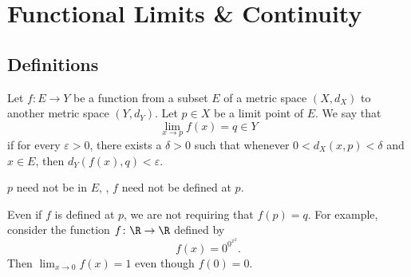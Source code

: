 \chapter{Functional Limits \& Continuity} \label{chp:fn}
\section{Definitions} \label{sec:fn:def}
\begin{definition}[Limit] \label{def:fn:limit}
    Let $f\colon E \to Y$ be a function from a subset $E$ of a metric space
    $(X, d_X)$ to another metric space $(Y, d_Y)$.
    Let $p \in X$ be a limit point of $E$.
    We say that \[
        \lim_{x \to p} f(x) = q \in Y
    \] if for every $\varepsilon > 0$, there exists a $\delta > 0$ such that
    whenever $0 < d_X(x, p) < \delta$ and $x \in E$,
    then $d_Y(f(x), q) < \varepsilon$.
\end{definition}
\begin{remarks}
    \item $p$ need not be in $E$, \ie, $f$ need not be defined at $p$.
    \item Even if $f$ is defined at $p$, we are not requiring that
    $f(p) = q$.
    For example, consider the function $f\colon \R \to \R$ defined by \[
        f(x) = 0^{0^{x^2}}.
    \] Then $\lim_{x \to 0} f(x) = 1$ even though $f(0) = 0$.
\end{remarks}

